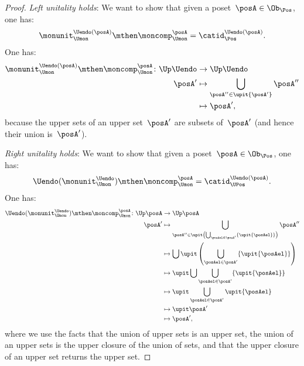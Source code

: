 \begin{proof}
    \emph{Left unitality holds}: We want to show that given a poset~$\posA\in \Ob_\Pos$, one has:
    \begin{equation}
        \monunit_{\Umon}^{\Uendo(\posA)}\mthen \moncomp_{\Umon}^{\posA}=\catid_{\Pos}^{\Uendo(\posA)}.
    \end{equation}
    One has:
    \begin{equation}
        \begin{aligned}
            \monunit_{\Umon}^{\Uendo(\posA)}\mthen \moncomp_{\Umon}^{\posA}\colon \Up \Uendo &\to \Up \Uendo\\
            \posA'&\mapsto \bigcup_{\posA''\in \upit \{ \posA'\}} \posA''\\
            &\mapsto \posA',
        \end{aligned}
    \end{equation}
    because the upper sets of an upper set~$\posA'$ are subsets of~$\posA'$ (and hence their union is~$\posA'$).

    \emph{Right unitality holds}: We want to show that given a poset~$\posA\in \Ob_\Pos$, one has:
    \begin{equation}
        \Uendo(\monunit_{\Umon}^{\Uendo})\mthen \moncomp_{\Umon}^{\posA}=\catid_{\UPos}^{\Uendo(\posA)}.
    \end{equation}
    One has:
    \begin{equation*}
        \begin{aligned}
            \Uendo(\monunit_{\Umon}^{\Uendo})\mthen \moncomp_{\Umon}^{\posA}\colon \Up \posA &\to \Up \posA\\
            \posA'&\mapsto \bigcup_{\posA''\in \upit \left( \bigcup_{\posAel \in \posA'}\{ \upit \{\posAel\}\}\right)}\posA''\\
            &\mapsto \bigcup \upit \left( \bigcup_{\posAel \in \posA'}\{\upit \{ \posAel\} \}\right)\\
            &\mapsto \upit \bigcup   \bigcup_{\posAel \in \posA'}\{\upit \{ \posAel\} \}\\
            &\mapsto \upit \bigcup_{\posAel \in \posA'}\upit \{ \posAel\}\\
            &\mapsto \upit \posA'\\
            &\mapsto \posA',
        \end{aligned}
    \end{equation*}
    where we use the facts that the union of upper sets is an upper set, the union of an upper sets is the upper closure of the union of sets, and that the upper closure of an upper set returns the upper set.


\end{proof}
